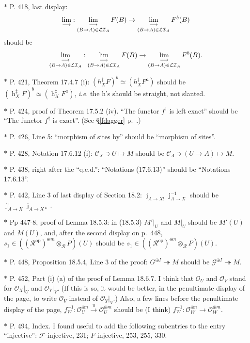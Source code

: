 \documentclass[12pt]{article}%
\theoremstyle{remark}
\theoremstyle{definition}
\newcommand{\nn}{\noindent}
\newcommand{\cc}{\mathcal}
\newcommand{\oo}{\operatorname}
\newcommand{\A}{\mathcal A}
\newcommand{\C}{\mathcal C}
\newcommand{\epi}{\twoheadrightarrow}
\newcommand{\xr}{\xrightarrow}
\newcommand{\ilim}{\operatornamewithlimits{\underset{\longrightarrow}{lim}}}
\DeclareMathOperator{\jj}{j}
\DeclareMathOperator{\op}{op}
\begin{document}
\nn$*$ P. 418, last display: 
$$
\ilim:\ilim_{(B\to A)\in\cc{LI}_A}F(B)\to\ilim_{(B\to A)\in\cc{LI}_A}F^b(B)
$$ 
should be 
$$
\ilim_{(B\to A)\in\cc{LI}_A}:\ilim_{(B\to A)\in\cc{LI}_A}F(B)\to\ilim_{(B\to A)\in\cc{LI}_A}F^b(B).
$$


\nn$*$ P. 421, Theorem 17.4.7 (i): $(h_X^\ddagger F)^b\simeq(h_X^\ddagger F^a)$ should be $(\oo h_X^\ddagger F)^b\simeq(\oo h_X^\ddagger F^a)$, \emph{i.e.} the h's should be straight, not slanted.

\noindent $*$ P. 424, proof of Theorem 17.5.2 (iv). ``The functor $f^\dagger$ is left exact'' should be ``The functor $f^\dagger$ is exact''. (See \S\ref{fdagger} p.~\pageref{fdagger}.) 

\noindent $*$ P. 426, Line 5: ``morphism of sites by'' should be ``morphism of sites''.

\noindent $*$ P. 428, Notation 17.6.12 (i): $\C_X\ni U\mapsto M$ should be $\C_A\ni(U\to A)\mapsto M$.

\noindent $*$ P. 438, right after the ``q.e.d.'': ``Notations (17.6.13)'' should be ``Notations 17.6.13''.

\noindent $*$ P. 442, Line 3 of last display of Section 18.2: $\jj_{A\to X!}\jj_{A\to X}^{-1}$ should be $\jj_{A\to X}^\ddagger\jj_{A\to X*}$.

\noindent $*$ Pp 447-8, proof of Lemma 18.5.3: in (18.5.3) $M'|_U$ and $M|_U$ should be $M'(U)$ and $M(U)$, and, after the second display on p.~448, $s_1\in((\cc R^{\op})^{\oplus m}\otimes_{\cc R}P)(U)$ should be $s_1\in((\cc R^{\op})^{\oplus n}\otimes_{\cc R}P)(U)$.

\noindent $*$ P. 448, Proposition 18.5.4, Line 3 of the proof: $G^{\oplus I}\epi M$ should be $\cc G^{\oplus I}\epi M$.

\noindent $*$ P. 452, Part (i) (a) of the proof of Lemma 18.6.7. I think that $\cc O_U$ and $\cc O_V$ stand for $\cc O_X|_U$ and $\cc O_Y|_V$. (If this is so, it would be better, in the penultimate display of the page, to write $\cc O_V$ instead of $\cc O_Y|_V$.) Also, a few lines before the penultimate display of the page, $f_W^{-1}:\cc O_U^{\oplus n}\xr u\cc O_U^{\oplus m}$ should be (I think) $f_W^{-1}:\cc O_W^{\oplus n}\to\cc O_W^{\oplus m}$.

\noindent $*$ P. 494, Index. I found useful to add the following subentries to the entry ``injective'': $\cc F$-injective, 231; $F$-injective, 253, 255, 330.
\end{document}
